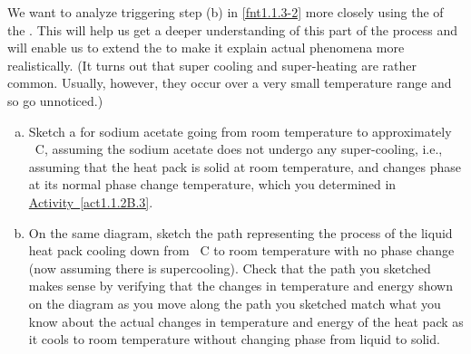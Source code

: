 \label{fnt1.1.3-3}

We want to analyze triggering step (b) in \ref{fnt1.1.3-2} more closely using the \TempGraph{} of the \ThreePhaseModel{}. This will help us get a deeper understanding of this part of the process and will enable us to extend the \ThreePhaseModel{} to make it explain actual phenomena more realistically. (It turns out that super cooling and super-heating are rather common. Usually, however, they occur over a very small temperature range and so go unnoticed.)

\begin{enumerate}[(a)]
	\item Sketch a \TempGraph{} for sodium acetate going from room temperature to approximately \unit[150]{\textdegree C}, assuming the sodium acetate does not undergo any super-cooling, i.e., assuming that the heat pack is solid at room temperature, and changes phase at its normal phase change temperature, which you determined in \hyperref[act1.1.2]{Activity~\ref*{act1.1.2B.3}}.
	
	\item On the same diagram, sketch the path representing the process of the liquid heat pack cooling down from \unit[150]{\textdegree C} to room temperature with no phase change (now assuming there is supercooling). Check that the path you sketched makes sense by verifying that the changes in temperature and energy shown on the diagram as you move along the path you sketched match what you know about the actual changes in temperature and energy of the heat pack as it cools to room temperature without changing phase from liquid to solid.
\end{enumerate}
